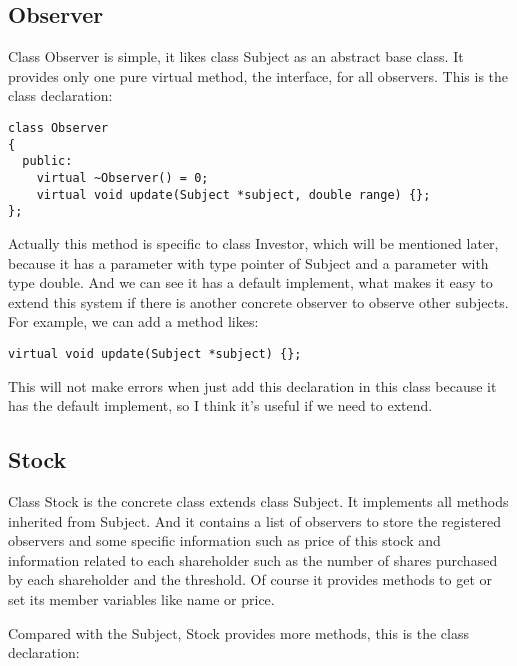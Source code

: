\documentclass{article}
\begin{document}
\subsection{Observer}
    Class Observer is simple, it likes class Subject as an abstract base class. It provides only one pure virtual method, the interface, for all observers. This is the class declaration:

\begin{lstlisting}
class Observer
{
  public:
    virtual ~Observer() = 0;
    virtual void update(Subject *subject, double range) {};
};
\end{lstlisting}

    Actually this method is specific to class Investor, which will be mentioned later, because it has a parameter with type pointer of Subject and a parameter with type double. And we can see it has a default implement, what makes it easy to extend this system if there is another concrete observer to observe other subjects. For example, we can add a method likes:

\begin{lstlisting}
virtual void update(Subject *subject) {};
\end{lstlisting}

    This will not make errors when just add this declaration in this class because it has the default implement, so I think it's useful if we need to extend.

\subsection{Stock}
    Class Stock is the concrete class extends class Subject. It implements all methods inherited from Subject. And it contains a list of observers to store the registered observers and some specific information such as price of this stock and information related to each shareholder such as the number of shares purchased by each shareholder and the threshold. Of course it provides methods to get or set its member variables like name or price.

    Compared with the Subject, Stock provides more methods, this is the class declaration:
\end{document}

